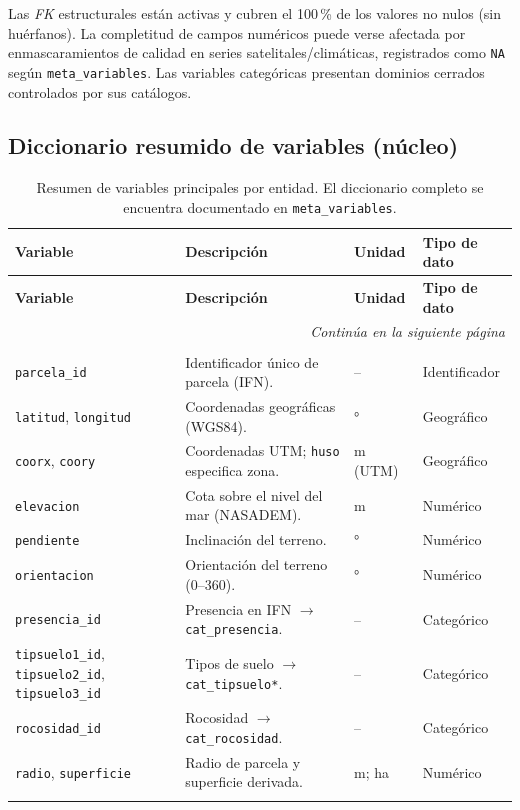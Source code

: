 Las \textit{FK} estructurales están activas y cubren el 100\,\% de los valores no nulos (sin huérfanos). La completitud de campos numéricos puede verse afectada por enmascaramientos de calidad en series satelitales/climáticas, registrados como \texttt{NA} según \texttt{meta\_variables}. Las variables categóricas presentan dominios cerrados controlados por sus catálogos.

\subsection*{Diccionario resumido de variables (núcleo)}
\small
\setlength{\LTcapwidth}{\textwidth}
\begin{longtable}{p{3.2cm} p{7.6cm} p{2.4cm} p{2.4cm}}
\caption{Resumen de variables principales por entidad. El diccionario completo se encuentra documentado en \texttt{meta\_variables}.}\\
\toprule
\textbf{Variable} & \textbf{Descripción} & \textbf{Unidad} & \textbf{Tipo de dato} \\
\midrule
\endfirsthead
\toprule
\textbf{Variable} & \textbf{Descripción} & \textbf{Unidad} & \textbf{Tipo de dato} \\
\midrule
\endhead
\midrule
\multicolumn{4}{r}{\emph{Continúa en la siguiente página}} \\
\midrule
\endfoot
\bottomrule
\endlastfoot

\multicolumn{4}{l}{\textbf{parcelas}} \\
\texttt{parcela\_id} & Identificador único de parcela (IFN). & -- & Identificador \\
\texttt{latitud}, \texttt{longitud} & Coordenadas geográficas (WGS84). & ° & Geográfico \\
\texttt{coorx}, \texttt{coory} & Coordenadas UTM; \texttt{huso} especifica zona. & m (UTM) & Geográfico \\
\texttt{elevacion} & Cota sobre el nivel del mar (NASADEM). & m & Numérico \\
\texttt{pendiente} & Inclinación del terreno. & ° & Numérico \\
\texttt{orientacion} & Orientación del terreno (0–360). & ° & Numérico \\
\texttt{presencia\_id} & Presencia en IFN $\rightarrow$ \texttt{cat\_presencia}. & -- & Categórico \\
\texttt{tipsuelo1\_id}, \texttt{tipsuelo2\_id}, \texttt{tipsuelo3\_id} & Tipos de suelo $\rightarrow$ \texttt{cat\_tipsuelo*}. & -- & Categórico \\
\texttt{rocosidad\_id} & Rocosidad $\rightarrow$ \texttt{cat\_rocosidad}. & -- & Categórico \\
\texttt{radio}, \texttt{superficie} & Radio de parcela y superficie derivada. & m; ha & Numérico \\
\addlinespace


\end{longtable}
